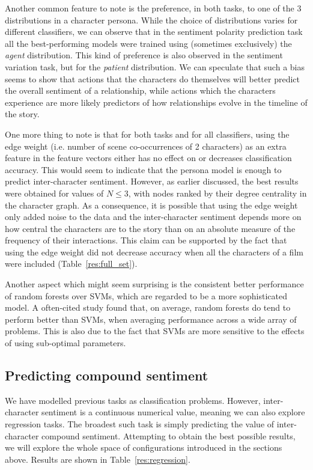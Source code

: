 \documentclass[bsc,frontabs,singlespacing,parskip, twoside]{infthesis}
\begin{document}
Another common feature to note is the preference, in both tasks, to one of the 3 distributions in a character persona. While the choice of distributions varies for different classifiers, we can observe that in the sentiment polarity prediction task all the best-performing models were trained using (sometimes exclusively) the \textit{agent} distribution. This kind of preference is also observed in the sentiment variation task, but for the \textit{patient} distribution. We can speculate that such a bias seems to show that actions that the characters do themselves will better predict the overall sentiment of a relationship, while actions which the characters experience are more likely predictors of how relationships evolve in the timeline of the story.

One more thing to note is that for both tasks and for all classifiers, using the edge weight (i.e. number of scene co-occurrences of 2 characters) as an extra feature in the feature vectors either has no effect on or decreases classification accuracy. This would seem to indicate that the persona model is enough to predict inter-character sentiment. However, as earlier discussed, the best results were obtained for values of $N \le 3$, with nodes ranked by their degree centrality in the character graph. As a consequence, it is possible that using the edge weight only added noise to the data and the inter-character sentiment depends more on how central the characters are to the story than on an absolute measure of the frequency of their interactions. This claim can be supported by the fact that using the edge weight did not decrease accuracy when all the characters of a film were included (Table~\ref{res:full_set}).

Another aspect which might seem surprising is the consistent better performance of random forests over SVMs, which are regarded to be a more sophisticated model. A often-cited study \cite{caruana2006} found that, on average, random forests do tend to perform better than SVMs, when averaging performance across a wide array of problems. This is also due to the fact that SVMs are more sensitive to the effects of using sub-optimal parameters.

\subsection{Predicting compound sentiment}
We have modelled previous tasks as classification problems. However, inter-character sentiment is a continuous numerical value, meaning we can also explore regression tasks. The broadest such task is simply predicting the value of inter-character compound sentiment. Attempting to obtain the best possible results, we will explore the whole space of configurations introduced in the sections above. Results are shown in Table~\ref{res:regression}. 
\end{document}
